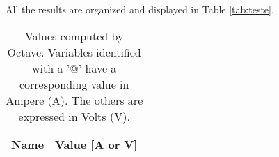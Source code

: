 All the results are organized and displayed in Table \ref{tab:teste}.


\begin{table}[h]
	\centering
	\begin{tabular}{|l|r|}
    		\hline    
    		{\bf Name} & {\bf Value [A or V]} \\ \hline
    		
  	\end{tabular}
  	\caption{Values computed by Octave. Variables identified with a '$@$' have a
  	corresponding value in Ampere (A). The others are expressed in Volts (V).}
 
\label{tab:oct}
\end{table}


